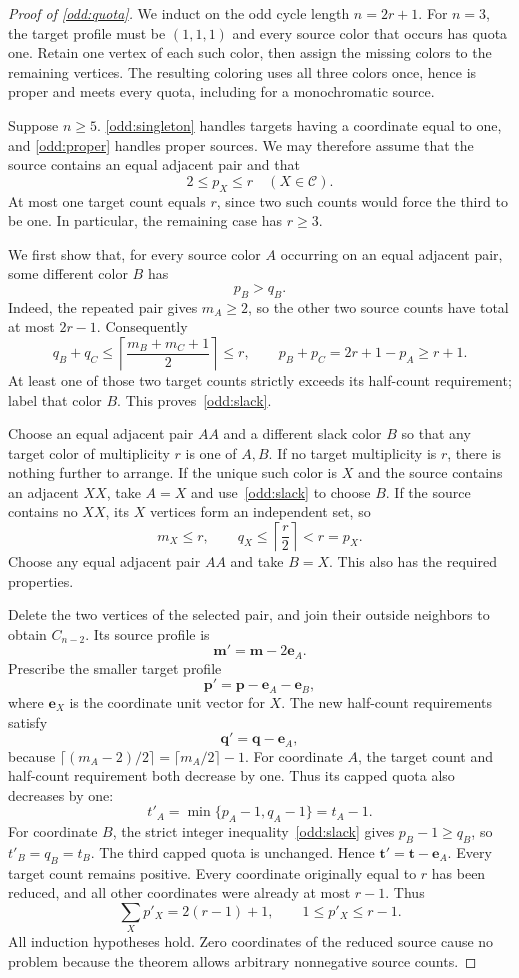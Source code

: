 \documentclass[10pt,a4paper]{amsart}
\numberwithin{equation}{section}
\theoremstyle{definition}
\theoremstyle{remark}
\begin{document}
\begin{proof}[Proof of \cref{odd:quota}]
We induct on the odd cycle length $n=2r+1$.
For $n=3$, the target profile must be $(1,1,1)$ and every source
color that occurs has quota one. Retain one vertex of each such
color, then assign the missing colors to the remaining vertices.
The resulting coloring uses all three colors once, hence is proper
and meets every quota, including for a monochromatic source.

Suppose $n\ge5$. \cref{odd:singleton} handles targets having
a coordinate equal to one, and \cref{odd:proper} handles
proper sources. We may therefore assume that the source contains an
equal adjacent pair and that
\[
2\le p_X\le r\quad(X\in\mathcal C).
\]
At most one target count equals $r$, since two such counts would
force the third to be one. In particular, the remaining case has
$r\ge3$.

We first show that, for every source color $A$ occurring on an equal
adjacent pair, some different color $B$ has
\begin{equation}\label{odd:slack}
p_B>q_B.
\end{equation}
Indeed, the repeated pair gives $m_A\ge2$, so the other two
source counts have total at most $2r-1$. Consequently
\[
q_B+q_C
\le\left\lceil\frac{m_B+m_C+1}{2}\right\rceil\le r,
\qquad
p_B+p_C=2r+1-p_A\ge r+1.
\]
At least one of those two target counts strictly exceeds its
half-count requirement; label that color $B$.
This proves~\eqref{odd:slack}.

Choose an equal adjacent pair $AA$ and a different slack color $B$
so that any target color of multiplicity $r$ is one of $A,B$.
If no target multiplicity is $r$, there is nothing further to arrange.
If the unique such color is $X$ and the source contains an adjacent
$XX$, take $A=X$ and use~\eqref{odd:slack} to choose $B$.
If the source contains no $XX$, its $X$ vertices form an independent
set, so
\[
m_X\le r,
\qquad q_X\le\left\lceil\frac r2\right\rceil<r=p_X.
\]
Choose any equal adjacent pair $AA$ and take $B=X$. This also
has the required properties.

Delete the two vertices of the selected pair, and join their outside
neighbors to obtain $C_{n-2}$. Its source profile is
\[
\mathbf m'=\mathbf m-2\mathbf e_A.
\]
Prescribe the smaller target profile
\[
\mathbf p'=\mathbf p-\mathbf e_A-\mathbf e_B,
\]
where $\mathbf e_X$ is the coordinate unit vector for $X$.
The new half-count requirements satisfy
\[
\mathbf q'=\mathbf q-\mathbf e_A,
\]
because $\lceil(m_A-2)/2\rceil=\lceil m_A/2\rceil-1$.
For coordinate $A$, the target count and half-count requirement
both decrease by one. Thus its capped quota also decreases by one:
\[
t'_A=\min\{p_A-1,q_A-1\}=t_A-1.
\]
For coordinate $B$, the strict integer inequality~\eqref{odd:slack}
gives $p_B-1\ge q_B$, so $t'_B=q_B=t_B$. The third capped quota
is unchanged. Hence $\mathbf t'=\mathbf t-\mathbf e_A$.
Every target count remains positive. Every coordinate originally
equal to $r$ has been reduced, and all other coordinates were already
at most $r-1$. Thus
\[
\sum_Xp'_X=2(r-1)+1,
\qquad 1\le p'_X\le r-1.
\]
All induction hypotheses hold. Zero coordinates of the reduced source
cause no problem because the theorem allows arbitrary nonnegative
source counts.


\end{proof}
\end{document}
